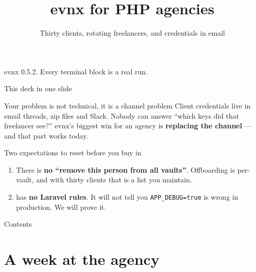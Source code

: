\documentclass[aspectratio=169,10pt]{beamer}
\title{evnx for PHP agencies}
\subtitle{Thirty clients, rotating freelancers, and credentials in email}
\date{}
\begin{document}
\begin{frame}[plain]
  \titlepage
  \begin{center}\footnotesize
  \textcolor{evnxMuted}{evnx 0.5.2. Every terminal block is a real run.}
  \end{center}
\end{frame}

\begin{frame}{This deck in one slide}
  \begin{block}{Your problem is not technical, it is a channel problem}
    Client credentials live in email threads, zip files and Slack. Nobody can
    answer ``which keys did that freelancer see?'' evnx's biggest win for an
    agency is \textbf{replacing the channel} --- and that part works today.
  \end{block}

  \vspace{0.7em}
  \begin{block}{Two expectations to reset before you buy in}
    \begin{enumerate}
      \item There is \textbf{no ``remove this person from all vaults''}.
            Offboarding is per-vault, and with thirty clients that is a list
            you maintain.
      \item {} has \textbf{no Laravel rules}. It will not tell you
            \texttt{APP\_DEBUG=true} is wrong in production. We will prove it.
    \end{enumerate}
  \end{block}
\end{frame}

\begin{frame}{Contents}\tableofcontents[hideallsubsections]\end{frame}

\section{A week at the agency}
\end{document}
